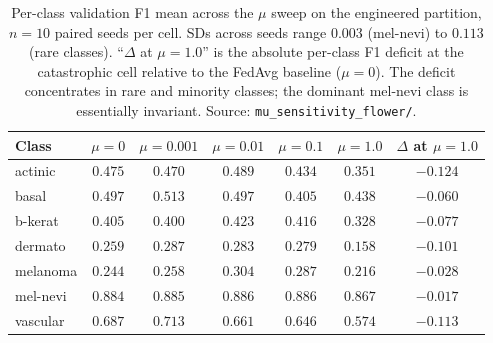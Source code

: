 \begin{table}[h]
\centering
\small
\caption{Per-class validation F1 mean across the $\mu$ sweep on the
engineered partition, $n = 10$ paired seeds per cell. SDs across seeds
range $0.003$ (mel-nevi) to $0.113$ (rare classes). ``$\Delta$ at $\mu=1.0$''
is the absolute per-class F1 deficit at the catastrophic cell relative to
the FedAvg baseline ($\mu = 0$). The deficit concentrates in rare and
minority classes; the dominant mel-nevi class is essentially invariant.
Source: \texttt{mu\_sensitivity\_flower/}.}
\label{tab:mu-per-class}
\begin{tabular}{lcccccc}
\hline
Class       & $\mu = 0$ & $\mu = 0.001$ & $\mu = 0.01$ & $\mu = 0.1$ & $\mu = 1.0$ & $\Delta$ at $\mu = 1.0$ \\
\hline
actinic     & $0.475$   & $0.470$       & $0.489$      & $0.434$     & $0.351$     & $-0.124$ \\
basal       & $0.497$   & $0.513$       & $0.497$      & $0.405$     & $0.438$     & $-0.060$ \\
b-kerat     & $0.405$   & $0.400$       & $0.423$      & $0.416$     & $0.328$     & $-0.077$ \\
dermato     & $0.259$   & $0.287$       & $0.283$      & $0.279$     & $0.158$     & $\mathbf{-0.101}$ \\
melanoma    & $0.244$   & $0.258$       & $0.304$      & $0.287$     & $0.216$     & $-0.028$ \\
mel-nevi    & $0.884$   & $0.885$       & $0.886$      & $0.886$     & $0.867$     & $-0.017$ \\
vascular    & $0.687$   & $0.713$       & $0.661$      & $0.646$     & $0.574$     & $\mathbf{-0.113}$ \\
\hline
\end{tabular}
\end{table}
